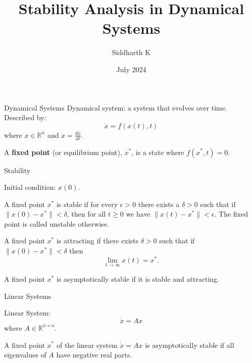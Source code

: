 \documentclass{beamer}
\title{Stability Analysis in Dynamical Systems}
\author{Siddharth K}
\date{July 2024}
\newcommand{\dx}{\dot{x}}
\begin{document}
\begin{frame}
    \titlepage
\end{frame}

\begin{frame}{Dynamical Systems}
    Dynamical system: a system that evolves over time.
    \vfill
    Described by:
    $$\dx = f(x(t), t)$$
    where $x \in \mathbb{R}^n$ and $\dx = \frac{dx}{dt}$. \\
    
    \begin{definition}
        A \textbf{fixed point} (or equilibrium point), $x^*$, is a state where $f(x^*, t) = 0$.
    \end{definition}
    
\end{frame}

\begin{frame}{Stability}

    Initial condition: $x(0)$. \\
    \pause
    \begin{definition}[Stable]
        A fixed point $x^*$ is stable if for every $\epsilon > 0$ there exists a $\delta > 0$ such that if $\|x(0) - x^*\| < \delta$, then for all $t \ge 0$ we have $\|x(t) - x^*\| < \epsilon$. The fixed point is called unstable otherwise.
    \end{definition}
    \pause
    \begin{definition}[Attracting]
        A fixed point $x^*$ is attracting if there exists $\delta > 0$ such that if $\|x(0) - x^*\| < \delta$ then $$\lim_{t \to \infty} x(t) = x^*.$$
    \end{definition}
    \pause
    \begin{definition}
        A fixed point $x^*$ is asymptotically stable if it is stable and attracting.
    \end{definition}
    
\end{frame}

\begin{frame}{Linear Systems}

    Linear System:
    $$\dx = Ax$$
    where $A \in \mathbb{R}^{n \times n}$.
    \vfill
    
    \begin{theorem}
        A fixed point $x^*$ of the linear system $\dx = Ax$ is asymptotically stable if all eigenvalues of $A$ have negative real parts.
    \end{theorem}
    
\end{frame}
\end{document}

